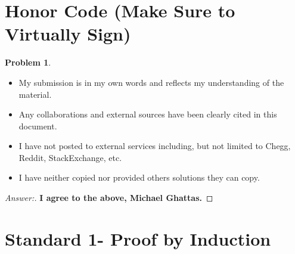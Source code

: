 \documentclass[11pt]{article}
\theoremstyle{definition}
\theoremstyle{definition}
\newtheorem{required}{Problem}
\theoremstyle{definition}
\begin{document}
\section{Honor Code (Make Sure to Virtually Sign)} \label{HonorCode}

\begin{required}
\begin{itemize}
\item My submission is in my own words and reflects my understanding of the material.
\item Any collaborations and external sources have been clearly cited in this document.
\item I have not posted to external services including, but not limited to Chegg, Reddit, StackExchange, etc.
\item I have neither copied nor provided others solutions they can copy.
\end{itemize}

\end{required}

\begin{proof}[Answer:]
\item \textbf{I agree to the above, Michael Ghattas.}
\end{proof}


\newpage
\section{Standard 1- Proof by Induction}
\end{document}
